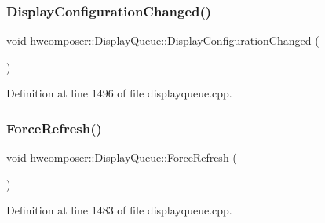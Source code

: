 \subsubsection{\texorpdfstring{Display\+Configuration\+Changed()}{DisplayConfigurationChanged()}}
{\footnotesize\ttfamily void hwcomposer\+::\+Display\+Queue\+::\+Display\+Configuration\+Changed (\begin{DoxyParamCaption}{ }\end{DoxyParamCaption})}



Definition at line 1496 of file displayqueue.\+cpp.


\begin{DoxyCode}{0}
\end{DoxyCode}
\mbox{\label{classhwcomposer_1_1DisplayQueue_a7aabbaa2b30bef9941b19694f55bc065}} 
\subsubsection{\texorpdfstring{Force\+Refresh()}{ForceRefresh()}}
{\footnotesize\ttfamily void hwcomposer\+::\+Display\+Queue\+::\+Force\+Refresh (\begin{DoxyParamCaption}{ }\end{DoxyParamCaption})}



Definition at line 1483 of file displayqueue.\+cpp.


